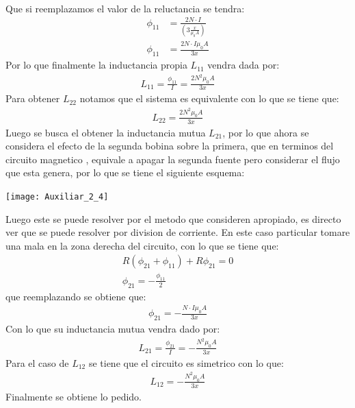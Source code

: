 \documentclass[
  11pt,
  letterpaper,
   addpoints,
   answers
  ]{exam}
\begin{document}
\begin{questions}
\begin{solution}
\begin{align}
        \end{align}
        Que si reemplazamos el valor de la reluctancia se tendra:
        \begin{align}
            \phi_{11} &= \frac{2N \cdot I}{\left(3\frac{x}{\mu_{0}A}\right)}\\
            \phi_{11} &= \frac{2N \cdot I \mu_{0}A}{3x}
        \end{align}
        Por lo que finalmente la inductancia propia $L_{11}$ vendra dada por:
        \begin{align}
            L_{11} = \frac{\phi_{11}}{I} = \frac{2N^{2} \mu_{0}A}{3x}
        \end{align}
        Para obtener $L_{22}$ notamos que el sistema es equivalente con lo que se tiene que:
        \begin{align}
            L_{22} = \frac{2N^{2} \mu_{0}A}{3x}
        \end{align}
        Luego se busca el obtener la inductancia mutua $L_{21}$, por lo que ahora se considera el efecto de la segunda bobina sobre la primera, que en terminos del circuito magnetico , equivale a apagar la segunda fuente pero considerar el flujo que esta genera, por lo que se tiene el siguiente esquema:
        \begin{center}
            \texttt{[image: Auxiliar\_2\_4]}
        \end{center}
        Luego este se puede resolver por el metodo  que consideren apropiado, es directo ver que se puede resolver por division de corriente. En este caso particular tomare una mala en la zona derecha del circuito, con lo que se tiene que:
        \begin{align}
            R(\phi_{21} + \phi_{11})+ R\phi_{21}= 0\\
            \phi_{21} = -\frac{\phi_{11}}{2}
        \end{align}
        que reemplazando se obtiene que:
        \begin{align}
            \phi_{21} = -\frac{N \cdot I \mu_{0}A}{3x}
        \end{align}
        Con lo que su inductancia mutua vendra dado por:
        \begin{align}
            L_{21} = \frac{\phi_{21}}{I} = -\frac{N^{2} \mu_{0}A}{3x}
        \end{align}
        Para el caso de $L_{12}$ se tiene que el circuito es simetrico con lo que:
        \begin{align}
            L_{12} = -\frac{N^{2} \mu_{0}A}{3x}
        \end{align}
        Finalmente se obtiene lo pedido.

\end{solution}
\end{questions}
\end{document}
